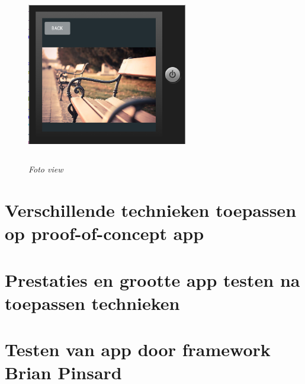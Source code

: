 \begin{figure}[H]
	\centering
	\caption{\textit{Foto view}}
	\includegraphics[width=7cm, height=7cm, keepaspectratio]{img/photoappgallery}\\[.5cm]
	
\end{figure}

\section{Verschillende technieken toepassen op proof-of-concept app}
\label{sec:techniekentoepassen}


\section{Prestaties en grootte app testen na toepassen technieken}
\label{sec:prestatiesgrootteapp}

\section{Testen van app door framework Brian Pinsard}
\label{sec:apptesting}